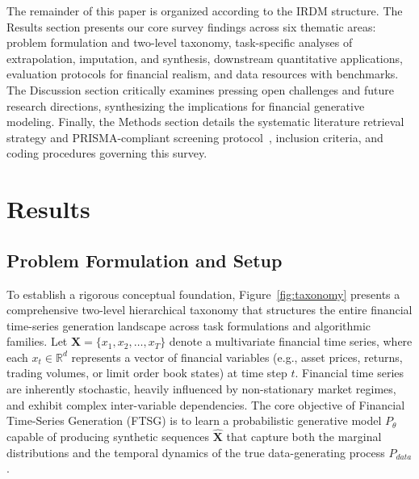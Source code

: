 \documentclass[11pt,a4paper]{article}
\begin{document}




The remainder of this paper is organized according to the IRDM structure. The Results section presents our core survey findings across six thematic areas: problem formulation and two-level taxonomy, task-specific analyses of extrapolation, imputation, and synthesis, downstream quantitative applications, evaluation protocols for financial realism, and data resources with benchmarks. The Discussion section critically examines pressing open challenges and future research directions, synthesizing the implications for financial generative modeling. Finally, the Methods section details the systematic literature retrieval strategy and PRISMA-compliant screening protocol~\citep{page2021prisma}, inclusion criteria, and coding procedures governing this survey.

\section{Results}
\subsection{Problem Formulation and Setup}
\label{sec:taxonomy}



To establish a rigorous conceptual foundation, Figure~\ref{fig:taxonomy} presents a comprehensive two-level hierarchical taxonomy that structures the entire financial time-series generation landscape across task formulations and algorithmic families.
Let $\mathbf{X} = \{x_1, x_2, \dots, x_T\}$ denote a multivariate financial time series, where each $x_t \in \mathbb{R}^d$ represents a vector of financial variables (e.g., asset prices, returns, trading volumes, or limit order book states) at time step $t$. Financial time series are inherently stochastic, heavily influenced by non-stationary market regimes, and exhibit complex inter-variable dependencies.
The core objective of Financial Time-Series Generation (FTSG) is to learn a probabilistic generative model $P_\theta$ capable of producing synthetic sequences $\hat{\mathbf{X}}$ that capture both the marginal distributions and the temporal dynamics of the true data-generating process $P_{data}$.
\end{document}
